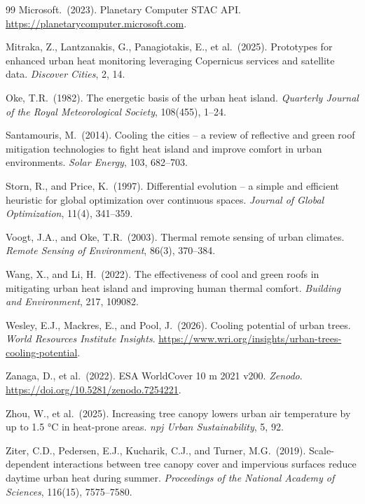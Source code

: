 \documentclass[12pt, letterpaper]{article}
\begin{document}
\begin{thebibliography}{99}
Microsoft.\ (2023).
Planetary Computer STAC API.
\url{https://planetarycomputer.microsoft.com}.

Mitraka, Z., Lantzanakis, G., Panagiotakis, E., et al.\ (2025).
Prototypes for enhanced urban heat monitoring leveraging Copernicus
services and satellite data.
\textit{Discover Cities}, 2, 14.

Oke, T.R.\ (1982).
The energetic basis of the urban heat island.
\textit{Quarterly Journal of the Royal Meteorological Society},
108(455), 1--24.

Santamouris, M.\ (2014).
Cooling the cities -- a review of reflective and green roof mitigation
technologies to fight heat island and improve comfort in urban environments.
\textit{Solar Energy}, 103, 682--703.

Storn, R., and Price, K.\ (1997).
Differential evolution -- a simple and efficient heuristic for global
optimization over continuous spaces.
\textit{Journal of Global Optimization}, 11(4), 341--359.

Voogt, J.A., and Oke, T.R.\ (2003).
Thermal remote sensing of urban climates.
\textit{Remote Sensing of Environment}, 86(3), 370--384.

Wang, X., and Li, H.\ (2022).
The effectiveness of cool and green roofs in mitigating urban heat island
and improving human thermal comfort.
\textit{Building and Environment}, 217, 109082.

Wesley, E.J., Mackres, E., and Pool, J.\ (2026).
Cooling potential of urban trees.
\textit{World Resources Institute Insights}.
\url{https://www.wri.org/insights/urban-trees-cooling-potential}.

Zanaga, D., et al.\ (2022).
ESA WorldCover 10 m 2021 v200.
\textit{Zenodo}. \url{https://doi.org/10.5281/zenodo.7254221}.

Zhou, W., et al.\ (2025).
Increasing tree canopy lowers urban air temperature by up to 1.5 °C in
heat-prone areas.
\textit{npj Urban Sustainability}, 5, 92.

Ziter, C.D., Pedersen, E.J., Kucharik, C.J., and Turner, M.G.\ (2019).
Scale-dependent interactions between tree canopy cover and impervious
surfaces reduce daytime urban heat during summer.
\textit{Proceedings of the National Academy of Sciences}, 116(15), 7575--7580.

\end{thebibliography}
\end{document}
